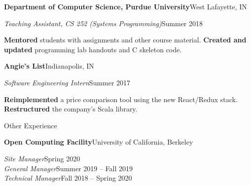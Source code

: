 \begin{minipage}[t]{0.665\textwidth}
  \vspace{5pt}
  \textbf{Department of Computer Science, Purdue University}\hfill West Lafayette, IN
  \begin{adjustwidth}{10pt}{}
    \emph{Teaching Assistant, CS 252 (Systems Programming)}\hfill Summer 2018

    \textbf{Mentored} students with assignments and other course material.
    \textbf{Created and updated} programming lab handouts and C skeleton code.
  \end{adjustwidth}

  \vspace{5pt}
  \textbf{Angie's List}\quad{}\hfill Indianapolis, IN
  \begin{adjustwidth}{10pt}{}
    \emph{Software Engineering Intern}\hfill Summer 2017

    \textbf{Reimplemented} a price comparison tool using the new React/Redux stack.
    \textbf{Restructured} the company's  Scala library.
  \end{adjustwidth}





  \vspace{10pt}

  {\sectionfont Other Experience}

  \vspace{5pt}
  \textbf{Open Computing Facility}\quad{}\hfill University of California, Berkeley
  \begin{adjustwidth}{10pt}{}
    \emph{Site Manager}\hfill Spring 2020\\
    \emph{General Manager}\hfill Summer 2019 -- Fall 2019\\
    \emph{Technical Manager}\hfill Fall 2018 -- Spring 2020


\end{adjustwidth}
\end{minipage}
